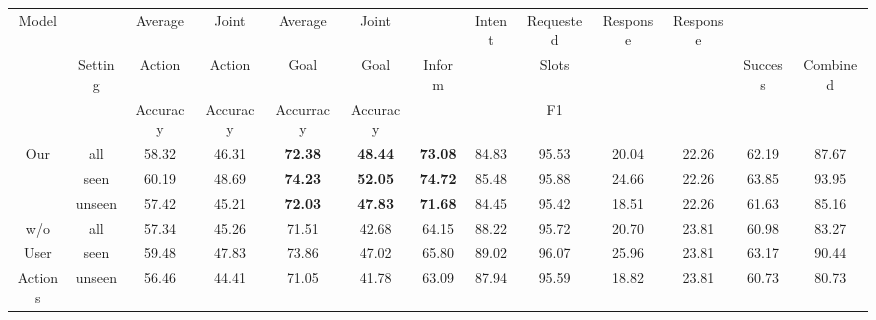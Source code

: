 \begin{table}
    \centering
    \begin{adjustbox}{max width=\textwidth}
        \begin{tabular}{|c|c|c|c|c|c|c|c|c|c|c|c|c|}
            \hline
            \multirow{3}{*}{Model} &         & Average  & Joint    & Average        & Joint          &                & \multirow{2}{*}{Intent}   & Requested & \multirow{2}{*}{Response} & \multirow{2}{*}{Response} &         &          \\
                                   & Setting & Action   & Action   & Goal           & Goal           & Inform         & \multirow{2}{*}{Accuracy} & Slots     & \multirow{2}{*}{GLEU}     & \multirow{2}{*}{ROUGE-2}  & Success & Combined \\
                                   &         & Accuracy & Accuracy & Accurracy      & Accuracy       &                &                           & F1        &                           &                           &         &          \\ \hline
            \multirow{3}{*}{Our}   & all     & 58.32    & 46.31    & \textbf{72.38} & \textbf{48.44} & \textbf{73.08} & 84.83                     & 95.53     & 20.04                     & 22.26                     & 62.19   & 87.67    \\
                                   & seen    & 60.19    & 48.69    & \textbf{74.23} & \textbf{52.05} & \textbf{74.72} & 85.48                     & 95.88     & 24.66                     & 22.26                     & 63.85   & 93.95    \\
                                   & unseen  & 57.42    & 45.21    & \textbf{72.03} & \textbf{47.83} & \textbf{71.68} & 84.45                     & 95.42     & 18.51                     & 22.26                     & 61.63   & 85.16    \\ \hline
            {w/o}                  & all     & 57.34    & 45.26    & 71.51          & 42.68          & 64.15          & 88.22                     & 95.72     & 20.70                     & 23.81                     & 60.98   & 83.27    \\
            {User}                 & seen    & 59.48    & 47.83    & 73.86          & 47.02          & 65.80          & 89.02                     & 96.07     & 25.96                     & 23.81                     & 63.17   & 90.44    \\
            {Actions}              & unseen  & 56.46    & 44.41    & 71.05          & 41.78          & 63.09          & 87.94                     & 95.59     & 18.82                     & 23.81                     & 60.73   & 80.73    \\ \hline

\end{tabular}
\end{adjustbox}
\end{table}
